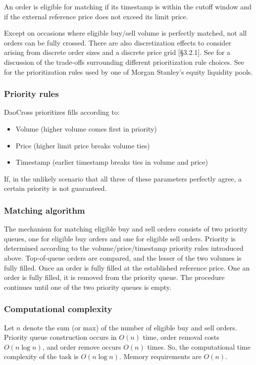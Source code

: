 \documentclass[11pt, reqno]{amsart}
\begin{document}
An order is eligible for matching if its timestamp is within the cutoff window
and if the external reference price does not exceed its limit price.

Except on occasions where eligible buy/sell volume is perfectly matched, not
all orders can be fully crossed. There are also discretization effects to
consider arising from discrete order sizes and a discrete price grid
\cite{BoBoDoGo18}[\S 3.2.1].
See \cite{BeLaLiVa22} for a discussion of the trade-offs surrounding
different prioritization rule choices. See \cite{MsAts} for the
prioritization rules used by one of Morgan Stanley's equity liquidity pools.

\subsubsection{Priority rules}
DaoCross prioritizes fills according to:
\begin{itemize}
	\item Volume (higher volume comes first in priority)
	\item Price (higher limit price breaks volume ties)
	\item Timestamp (earlier timestamp breaks ties in volume and price)
\end{itemize}
If, in the unlikely scenario that all three of these parameters perfectly
agree, a certain priority is not guaranteed.

\subsubsection{Matching algorithm}
The mechanism for matching eligible buy and sell orders consists of two
priority queues, one for eligible buy orders and one for eligible sell orders.
Priority is determined according to the volume/price/timestamp priority rules
introduced above. Top-of-queue orders are compared, and the lesser of the two
volumes is fully filled. Once an order is fully filled at the established
reference price. One an order is fully filled, it is removed from the priority
queue. The procedure continues until one of the two priority queues is empty.

\subsubsection{Computational complexity}
Let $n$ denote the sum (or max) of the number of eligible buy and sell orders.
Priority queue construction occurs in $O(n)$ time, order removal costs
$O(n \log n)$, and order remove occurs $O(n)$ times. So, the computational
time complexity of the task is $O(n \log n)$. Memory requirements are $O(n)$.
\end{document}
